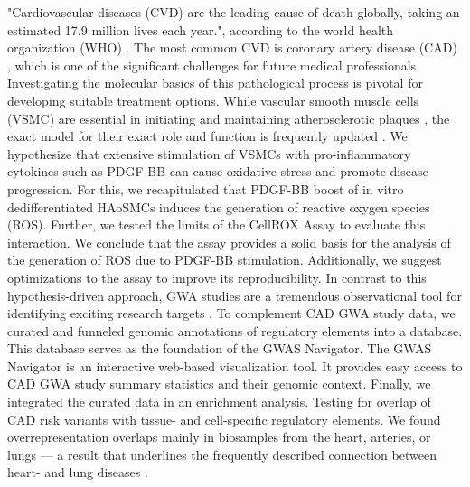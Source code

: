 "Cardiovascular diseases (CVD) are the leading cause of death globally, taking an estimated 17.9 million lives each year.", according to the world health organization (WHO) \cite{}. The most common CVD is coronary artery disease (CAD) \cite{}, which is one of the significant challenges for future medical professionals. Investigating the molecular basics of this pathological process is pivotal for developing suitable treatment options.
While vascular smooth muscle cells (VSMC) are essential in initiating and maintaining atherosclerotic plaques \cite{}, the exact model for their exact role and function is frequently updated \cite{}. We hypothesize that extensive stimulation of VSMCs with pro-inflammatory cytokines such as PDGF-BB can cause oxidative stress and promote disease progression.
For this, we recapitulated that PDGF-BB boost of in vitro dedifferentiated HAoSMCs induces the generation of reactive oxygen species (ROS). Further, we tested the limits of the CellROX Assay to evaluate this interaction. We conclude that the assay provides a solid basis for the analysis of the generation of ROS due to PDGF-BB stimulation. Additionally, we suggest optimizations to the assay to improve its reproducibility.
In contrast to this hypothesis-driven approach, GWA studies are a tremendous observational tool for identifying exciting research targets \cite{}.
To complement CAD GWA study data, we curated and funneled genomic annotations of regulatory elements into a database. This database serves as the foundation of the GWAS Navigator. The GWAS Navigator is an interactive web-based visualization tool. It provides easy access to CAD GWA study summary statistics and their genomic context.
Finally, we integrated the curated data in an enrichment analysis. Testing for overlap of CAD risk variants with tissue- and cell-specific regulatory elements. We found overrepresentation overlaps mainly in biosamples from the heart, arteries, or lungs — a result that underlines the frequently described connection between heart- and lung diseases \cite{carterAssociationCardiovascularDisease2019, nowakLungFunctionCoronary2018, hanPulmonaryDiseasesHeart2007}.

